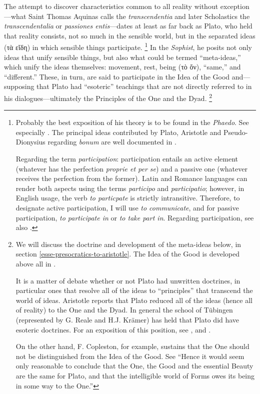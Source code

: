 The attempt to discover characteristics common to all reality without exception—what Saint Thomas Aquinas calls the \emph{transcendentia} and later Scholastics the \emph{transcendentalia} or \emph{passiones entis}—dates at least as far back as Plato, who held that reality consists, not so much in the sensible world, but in the separated ideas (τὰ εἴδη) in which sensible things participate.%
%
\footnote{Probably the best exposition of his theory is to be found in the \emph{Phaedo}. See especially \cite[78c–79a, and 100b–101d]{plato:phaedo}. The principal ideas contributed by Plato, Aristotle and Pseudo-Dionysius regarding \emph{bonum} are well documented in \cite[290-298]{aertsen:transcendentals}.

Regarding the term \emph{participation}: participation entails an active element (whatever has the perfection \emph{proprie et per se}) and a passive one (whatever receives the perfection from the former). Latin and Romance languages can render both aspects using the terms \emph{participo} and \emph{participatio}; however, in English usage, the verb \emph{to particpate} is strictly intransitive. Therefore, to designate active participation, I will use \emph{to communicate}, and for passive participation, \emph{to participate in} or \emph{to take part in}. Regarding participation, see also \cite[453–456]{fabro:intensive}.}
%
In the \emph{Sophist}, he posits not only ideas that unify sensible things, but also what could be termed \enquote{meta-ideas,} which unify the ideas themselves: movement, rest, being (τὸ ὄν), \enquote{same,} and \enquote{different.} These, in turn, are said to participate in the Idea of the Good and—supposing that Plato had \enquote{esoteric} teachings that are not directly referred to in his dialogues—ultimately the Principles of the One and the Dyad.%
%
\footnote{We will discuss the doctrine and development of the meta-ideas below, in section \ref{esse-presocratics-to-aristotle}. The Idea of the Good is developed above all in \cite[VI, 508c–509a]{plato:republic}. 

It is a matter of debate whether or not Plato had unwritten doctrines, in particular ones that resolve all of the ideas to “principles” that transcend the world of ideas. Aristotle reports that Plato reduced all of the ideas (hence all of reality) to the One and the Dyad. \parencite[See][Α, 6, 987b19-988a7.]{aristotle:metaphysics} In general the school of Tübingen (represented by G. Reale and  H.J. Krämer) has held that Plato did have esoteric doctrines. For an exposition of this position, see \cite{kramer:platone}, and \cite{reale:nuova}.

On the other hand, F. Copleston, for example, sustains that the One should not be distinguished from the Idea of the Good. See \cite[177]{copleston:history:01} “Hence it would seem only reasonable to conclude that the One, the Good and the essential Beauty are the same for Plato, and that the intelligible world of Forms owes its being in some way to the One.”}
